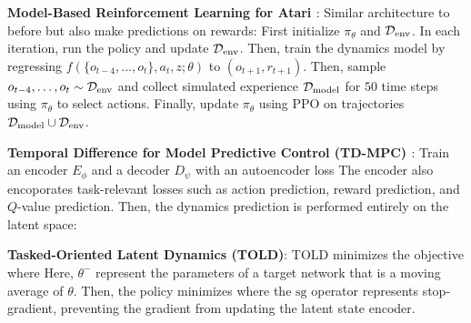 \documentclass{article}
\begin{document}
  \textbf{Model-Based Reinforcement Learning for Atari \cite{kaiser2019model}}: Similar architecture to before but also make predictions on rewards: First initialize $\pi_\theta$ and $\mathcal{D}_\text{env}$. In each iteration, run the policy and update $\mathcal{D}_\text{env}$. Then, train the dynamics model by regressing $f(\{o_{t-4},\dots,o_t\},a_t,z;\theta)$ to $(o_{t+1}, r_{t+1})$. Then, sample $o_{t-4},\dots,o_t\sim \mathcal{D}_\text{env}$ and collect simulated experience $\mathcal{D}_\text{model}$ for $50$ time steps using $\pi_\theta$ to select actions. Finally, update $\pi_\theta$ using PPO on trajectories $\mathcal{D}_\text{model}\cup \mathcal{D}_\text{env}$. 

  \textbf{Temporal Difference for Model Predictive Control (TD-MPC) \cite{hansen2022temporal}}: Train an encoder $E_\phi$ and a decoder $D_\psi$ with an autoencoder loss
  The encoder also encoporates task-relevant losses such as action prediction, reward prediction, and $Q$-value prediction. Then, the dynamics prediction is performed entirely on the latent space:

  \textbf{Tasked-Oriented Latent Dynamics (TOLD)}: TOLD minimizes the objective
  where
  Here, $\theta^-$ represent the parameters of a target network that is a moving average of $\theta$. Then, the policy minimizes
  where the $\mathrm{sg}$ operator represents stop-gradient, preventing the gradient from updating the latent state encoder.
\end{document}
